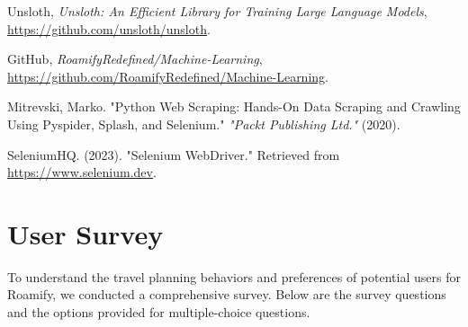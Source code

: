 \documentclass[conference]{IEEEtran}
\begin{document}
\begin{thebibliography}{1}
    Unsloth, \emph{Unsloth: An Efficient Library for Training Large Language Models}, \href{https://github.com/unsloth/unsloth}{https://github.com/unsloth/unsloth}.

    GitHub, \emph{RoamifyRedefined/Machine-Learning}, \href{https://github.com/RoamifyRedefined/Machine-Learning}{https://github.com/RoamifyRedefined/Machine-Learning}.

    Mitrevski, Marko. "Python Web Scraping: Hands-On Data Scraping and Crawling Using Pyspider, Splash, and Selenium." \emph{"Packt Publishing Ltd."} (2020).

    SeleniumHQ. (2023). "Selenium WebDriver." Retrieved from \url{https://www.selenium.dev}.

\end{thebibliography}

\newpage

\appendix

\section{User Survey}
    To understand the travel planning behaviors and preferences of potential users for Roamify, we conducted a comprehensive survey. Below are the survey questions and the options provided for multiple-choice questions.
\end{document}
